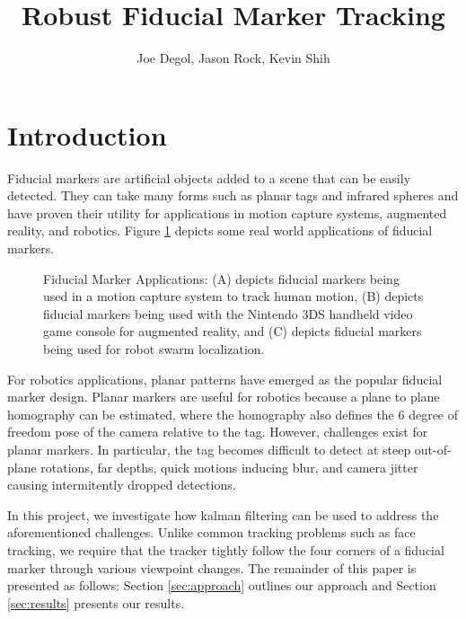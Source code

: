\documentclass[12pt]{article}
\title{Robust Fiducial Marker Tracking}
\author{Joe Degol, Jason Rock, Kevin Shih}
\begin{document}
\maketitle

\section{Introduction}
Fiducial markers are artificial objects added to a scene that can be easily detected. They can take many forms such as planar tags and infrared spheres and have proven their utility for applications in motion capture systems, augmented reality, and robotics. Figure \ref{fig:applications} depicts some real world applications of fiducial markers.

\begin{figure}[h]
\centering
\caption{Fiducial Marker Applications: (A) depicts fiducial markers being used in a motion capture system to track human motion, (B) depicts fiducial markers being used with the Nintendo 3DS handheld video game console for augmented reality, and (C) depicts fiducial markers being used for robot swarm localization.}
\label{fig:applications}
\end{figure}

For robotics applications, planar patterns have emerged as the popular fiducial marker design. Planar markers are useful for robotics because a plane to plane homography can be estimated, where the homography also defines the 6 degree of freedom pose of the camera relative to the tag. However, challenges exist for planar markers. In particular, the tag becomes difficult to detect at steep out-of-plane rotations, far depths, quick motions inducing blur, and camera jitter causing intermitently dropped detections.

In this project, we investigate how kalman filtering can be used to address the aforementioned challenges. Unlike common tracking problems such as face tracking, we require that the tracker tightly follow the four corners of a fiducial marker through various viewpoint changes. The remainder of this paper is presented as follows: Section \ref{sec:approach} outlines our approach and Section \ref{sec:results} presents our results.
\end{document}
